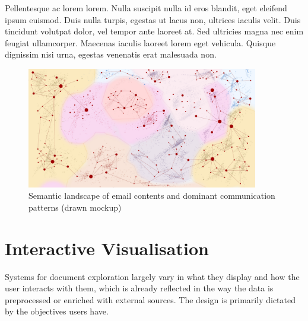 Pellentesque ac lorem lorem. Nulla suscipit nulla id eros blandit, eget eleifend ipsum euismod. Duis nulla turpis, egestas ut lacus non, ultrices iaculis velit. Duis tincidunt volutpat dolor, vel tempor ante laoreet at. Sed ultricies magna nec enim feugiat ullamcorper. Maecenas iaculis laoreet lorem eget vehicula. Quisque dignissim nisi urna, egestas venenatis erat malesuada non. 


\begin{figure}
	\includegraphics[width=0.9\textwidth]{mockup2}
	\caption{Semantic landscape of email contents and dominant communication patterns (drawn mockup)}
	\label{fig:mockup}
\end{figure}



\section{Interactive Visualisation}
Systems for document exploration largely vary in what they display and how the user interacts with them, which is already reflected in the way the data is preprocessed or enriched with external sources. 
The design is primarily dictated by the objectives users have.

